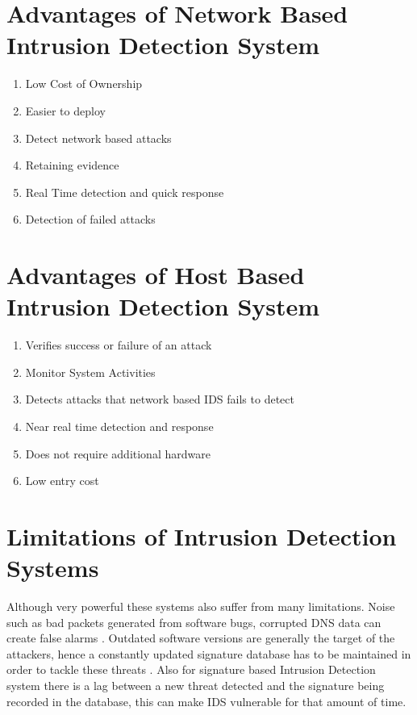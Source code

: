\documentclass[12pt, a4paper]{report}
\begin{document}
\section{Advantages of Network Based Intrusion Detection System}\label{sec:advantagesofNIDS}
\begin{enumerate}
	\item {Low Cost of Ownership}
	\item {Easier to deploy}
	\item {Detect network based attacks}
	\item {Retaining evidence}
	\item {Real Time detection and quick response}
	\item {Detection of failed attacks}
\end{enumerate}

\section{Advantages of Host Based Intrusion Detection System} \label{sec:advantagesHostBasedIDS}
\begin{enumerate}
	\item{Verifies success or failure of an attack}
	\item{Monitor System Activities}
	\item{Detects attacks that network based IDS fails to detect}
	\item{Near real time detection and response}
	\item{Does not require additional hardware}
	\item{Low entry cost}
\end{enumerate}


\section{Limitations of Intrusion Detection Systems}\label{sec:limitsofIDS}

Although very powerful these systems also suffer from many limitations. Noise such as bad packets generated from software bugs, corrupted DNS data can create false alarms \cite{securityengineering}. Outdated software versions are generally the target of the attackers, hence a constantly updated signature database has to be maintained in order to tackle these threats \cite{securityengineering}. Also for signature based Intrusion Detection system there is a lag between a new threat detected and the signature being recorded in the database, this can make IDS vulnerable for that amount of time. \\ \par
\end{document}
